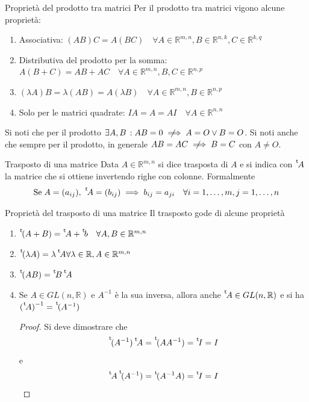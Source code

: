 \begin{SubDef}{Proprietà del prodotto tra matrici}
  Per il prodotto tra matrici vigono alcune proprietà:
  \begin{enumerate}
    \item Associativa: $(AB)C = A(BC)\quad\forall A\in\mathbb{R}^{m,n},
      B\in\mathbb{R}^{n,k},C\in\mathbb{R}^{k,q}$
    \item Distributiva del prodotto per la somma: $A(B+C) = AB+AC\quad\forall
      A\in\mathbb{R}^{m,n},B,C\in\mathbb{R}^{n,p}$
    \item $(\lambda A)B = \lambda(AB) = A(\lambda B)\quad\forall A\in\mathbb{R}^{m,n},
      B\in\mathbb{R}^{n,p}$
    \item Solo per le matrici quadrate: $IA = A = AI\quad\forall A\in\mathbb{R}^{n,n}$
  \end{enumerate}
\end{SubDef}
Si noti che per il prodotto $\exists A,B\suchthat AB=0 \notimplies A=O\lor B=O$. Si noti
anche che sempre per il prodotto, in generale $AB=AC\notimplies B=C$ con $A\neq O$.

\begin{Def}{Trasposto di una matrice}
  Data $A\in\mathbb{R}^{m,n}$ si dice trasposta di $A$ e si indica con $\transp A$ la matrice
  che si ottiene invertendo righe con colonne. Formalmente
  \begin{equation*}
    \text{Se}\; A=(a_{ij}),\; \transp A = (b_{ij})\implies b_{ij} = a_{ji}\quad\forall
    i=1,\ldots,m, j=1,\ldots,n
  \end{equation*}
\end{Def}

\begin{SubDef}{Proprietà del trasposto di una matrice}
  Il trasposto gode di alcune proprietà
  \begin{enumerate}
    \item $\transp(A+B) = \transp A+\transp b\quad\forall A,B\in\mathbb{R}^{m,n}$
    \item $\transp (\lambda A)=\lambda \transp A\forall\lambda\in\mathbb{R},
      A\in\mathbb{R}^{m,n}$
    \item $\transp{(AB)} = \transp B\transp A$
    \item Se $A\in GL(n,\mathbb{R})$ e $A^{-1}$ è la sua inversa, allora anche
      $\transp{A}\in GL(n,\mathbb{R})$ e si ha ${(\transp A)}^{-1} = \transp{(A^{-1})}$
      \begin{proof}
        Si deve dimostrare che
        \begin{equation*}
          \transp{(A^{-1})}\transp A = \transp{(AA^{-1})} = \transp I = I
        \end{equation*}
        e
        \begin{equation*}
          \transp A\transp{(A^{-1})} = \transp (A^{-1}A) = \transp I = I
        \end{equation*}
      \end{proof}
  \end{enumerate}
\end{SubDef}

